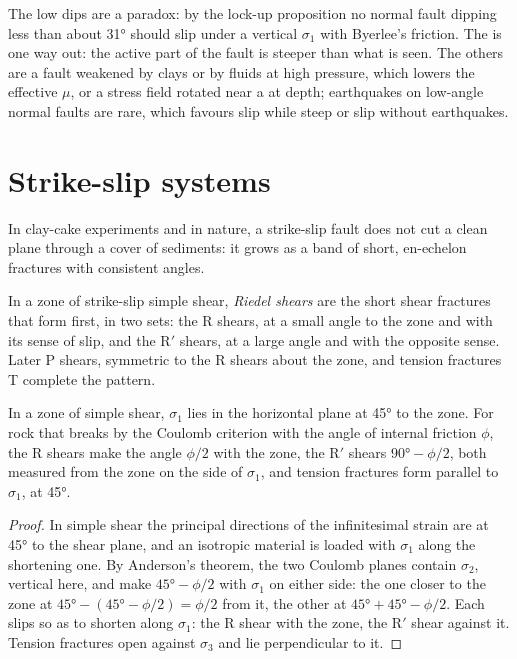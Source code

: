 The low dips are a paradox: by the lock-up proposition no normal fault dipping
less than about \ang{31} should slip under a vertical $\sigma_1$ with
Byerlee's friction. The  is one way out: the active part of the
fault is steeper than what is seen. The others are a fault weakened by clays
or by fluids at high pressure, which lowers the effective $\mu$, or a stress
field rotated near a  at depth; earthquakes on low-angle normal
faults are rare, which favours slip while steep or slip without earthquakes.

\section{Strike-slip systems}\label{sec:b3:extension-strike-slip:strike-slip}

In clay-cake experiments and in nature, a strike-slip fault does not cut a
clean plane through a cover of sediments: it grows as a band of short,
en-echelon fractures with consistent angles.

\begin{definition}\label{def:b3:extension-strike-slip:riedel}
In a zone of strike-slip simple shear, \emph{Riedel shears}
are the short shear fractures that form first, in two sets: the R
shears, at a small angle to the zone and with its sense of slip, and the R$'$
shears, at a large angle and with the opposite sense. Later P shears, symmetric
to the R shears about the zone, and tension fractures T complete the pattern.
\end{definition}

\begin{proposition}\label{prop:b3:extension-strike-slip:riedel}
In a zone of simple shear, $\sigma_1$ lies in the horizontal plane at
\ang{45} to the zone. For rock that breaks by the Coulomb criterion with the
angle of internal friction $\phi$, the R shears make the angle $\phi/2$ with
the zone, the R$'$ shears $\ang{90} - \phi/2$, both measured from the zone
on the side of $\sigma_1$, and tension fractures form parallel to $\sigma_1$,
at \ang{45}.
\end{proposition}

\begin{proof}
In simple shear the principal directions of the infinitesimal strain are at
\ang{45} to the shear plane, and an isotropic material is loaded with
$\sigma_1$ along the shortening one. By Anderson's theorem, the two Coulomb
planes contain $\sigma_2$, vertical here, and make $\ang{45} - \phi/2$ with
$\sigma_1$ on either side: the one closer to the zone at $\ang{45} -
(\ang{45} - \phi/2) = \phi/2$ from it, the other at $\ang{45} + \ang{45} -
\phi/2$. Each slips so as to shorten along $\sigma_1$: the R shear with the
zone, the R$'$ shear against it. Tension fractures open against $\sigma_3$ and
lie perpendicular to it.
\end{proof}

